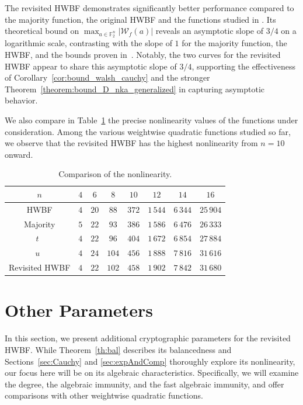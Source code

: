 \documentclass[runningheads,orivec]{llncs}
\newcommand{\hwbf}{\textsf{HWBF}}
\newcommand{\wt}[1]{\mathcal W_{#1}}
\begin{document}
    The revisited \hwbf{} demonstrates significantly better performance compared to the majority function, the original \hwbf{} and the functions studied in \cite{DAM:MeaOza24}. Its theoretical bound on $\max_{a \in \mathbb{F}_2^n} |\wt f(a)|$ reveals an asymptotic slope of $3/4$ on a logarithmic scale, contrasting with the slope of $1$ for the majority function, the \hwbf{}, and the bounds proven in~\cite{DAM:MeaOza24}. Notably, the two curves for the revisited \hwbf{} appear to share this asymptotic slope of $3/4$, supporting the effectiveness of Corollary~\ref{cor:bound_walsh_cauchy} and the stronger Theorem~\ref{theorem:bound_D_nka_generalized} in capturing asymptotic behavior.
    
    \bigskip
    
    We also compare in Table~\ref{table:comparisonsNL} the precise nonlinearity values of the functions under consideration. Among the various weightwise quadratic functions studied so far, we observe that the revisited \hwbf{} has the highest nonlinearity from $n=10$ onward.
    
    \begin{table}
    	\scriptsize
    	\centering
        \caption{Comparison of the nonlinearity.}
    	\label{table:comparisonsNL}
    	\begin{tabular}{|c|c|c|c|c|c|c|c|}
    		\hline
            $n$&$4$&$6$&$8$&$10$&$12$&$14$&$16$\\
            \hline	
            \hwbf{}&$4$&$20$&$88$&$372$&$1\,544$&$6\,344$&$25\,904$\\  	
            Majority&$5$&$22$&$93$&$386$&$1\,586$&$6\,476$&$26\,333$\\
            $t$~\cite{DAM:MeaOza24}&$4$&$22$&$96$&$404$&$1\,672$&$6\,854$&$27\,884$\\
            $u$~\cite{DAM:MeaOza24}&$4$&$24$&$104$&$456$&$1\,888$&$7\,816$&$31\,616$\\
            Revisited \hwbf{}&$4$&$22$&$102$&$458$&$1\,902$&$7\,842$&$31\,680$\\
    		\hline
    	\end{tabular}
    \end{table}
    
    \section{Other Parameters}\label{sec:otherParameters}
    
    In this section, we present additional cryptographic parameters for the revisited \hwbf{}. While Theorem~\ref{th:bal} describes its balancedness and Sections~\ref{sec:Cauchy} and \ref{sec:expAndComp} thoroughly explore its nonlinearity, our focus here will be on its algebraic characteristics. Specifically, we will examine the degree, the algebraic immunity, and the fast algebraic immunity, and offer comparisons with other weightwise quadratic functions.
    
\end{document}
